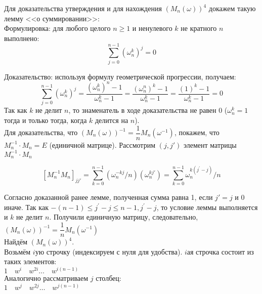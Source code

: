 \documentclass[a4paper,12pt]{article} %
\begin{document}
Для доказательства утверждения и для нахождения $(M_n(\omega))^4$ докажем такую лемму <<о суммировании>>:\\

Формулировка: для любого целого $ n \geqslant 1 $ и ненулевого $ k $ не кратного $ n $ выполнено:
$$\sum_{j=0}^{n-1}\left(\omega_{n}^{k}\right)^{j}=0$$

Доказательство: используя формулу геометрической прогрессии, получаем: 
$$\sum_{j=0}^{n-1}\left(\omega_{n}^{k}\right)^{j}=\frac{\left(\omega_{n}^{k}\right)^{n}-1}{\omega_{n}^{k}-1}=\frac{\left(\omega_{n}^{n}\right)^{k}-1}{\omega_{n}^{k}-1}=\frac{(1)^{k}-1}{\omega_{n}^{k}-1}=0$$
Так как $ k $ не делит $ n $, то знаменатель в ходе доказательства не равен 0 ($ \omega_{n}^{k} = 1 $ тогда и только тогда, когда $ k $ делится на $ n $).\\

Для доказательства, что $(M_n(\omega))^{-1} = \dfrac{1}{n}M_n(\omega^{-1})$, покажем, что $ M_n^{-1} \cdot M_n = E $ (единичной матрице). Рассмотрим $ (j, j') $ элемент матрицы $ M_n^{-1} \cdot M_n$

$$\left[M_{n}^{-1} M_{n}\right]_{j j \prime}=\sum_{k=0}^{n-1}\left(\omega_{n}^{-k j} / n\right)\left(\omega_{n}^{k j \prime}\right)=\sum_{k=0}^{n-1} \omega_{n}^{k\left(j^{\prime}-j\right)} / n$$

Согласно доказанной ранее лемме, полученная сумма равна 1, если $ j' = j $ и 0 иначе. Так как $-(n-1) \leq j^{\prime}-j \leq n-1, j^{\prime}-j$, то условие леммы выполняется и $ k $ не делит $ n $. Получили единичную матрицу, следовательно, $(M_n(\omega))^{-1} = \dfrac{1}{n}M_n(\omega^{-1})$\\

Найдём $(M_n(\omega))^4$.\\

Возьмём $ i $ую строчку (индексируем с нуля для удобства). $ i $ая строчка состоит из таких элементов:\\ $ 1 \quad w^i \quad w^{2i} \ldots \quad w^{i(n-1)}$\\
Аналогично рассматриваем $ j $ столбец:\\
$ 1 \quad w^j \quad w^{2j} \ldots \quad w^{j(n-1)}$\\ 
\end{document}
